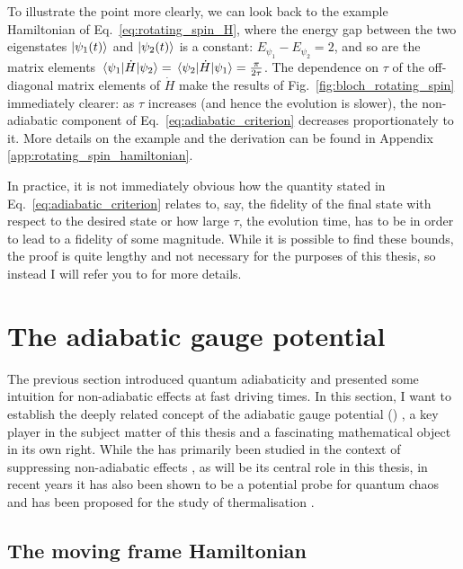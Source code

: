     To illustrate the point more clearly, we can look back to the example Hamiltonian of Eq.~\eqref{eq:rotating_spin_H}, where the energy gap between the two eigenstates $\ket{\psi_1(t)}$ and $\ket{\psi_2(t)}$ is a constant: $E_{\psi_1} - E_{\psi_2} = 2$, and so are the matrix elements $\mel{\psi_1}{\dot{H}}{\psi_2} = \mel{\psi_2}{\dot{H}}{\psi_1} = \frac{\pi}{2 \tau}$. The dependence on $\tau$ of the off-diagonal matrix elements of $\dot{H}$ make the results of Fig.~\ref{fig:bloch_rotating_spin} immediately clearer: as $\tau$ increases (and hence the evolution is slower), the non-adiabatic component of Eq.~\eqref{eq:adiabatic_criterion} decreases proportionately to it. More details on the example and the derivation can be found in Appendix \ref{app:rotating_spin_hamiltonian}.

     In practice, it is not immediately obvious how the quantity stated in Eq.~\eqref{eq:adiabatic_criterion} relates to, say, the fidelity of the final state with respect to the desired state or how large $\tau$, the evolution time, has to be in order to lead to a fidelity of some magnitude. While it is possible to find these bounds, the proof is quite lengthy and not necessary for the purposes of this thesis, so instead I will refer you to \cite{reichardt_quantum_2004, childs_lecture_2008} for more details.
    
    \section{The adiabatic gauge potential}\label{sec:2.2_AGP}

    The previous section introduced quantum adiabaticity and presented some intuition for non-adiabatic effects at fast driving times. In this section, I want to establish the deeply related concept of the adiabatic gauge potential () \cite{kolodrubetz_geometry_2017}, a key player in the subject matter of this thesis and a fascinating mathematical object in its own right. While the  has primarily been studied in the context of suppressing non-adiabatic effects \cite{sels_minimizing_2017, claeys_floquet-engineering_2019}, as will be its central role in this thesis, in recent years it has also been shown to be a potential probe for quantum chaos \cite{pandey_adiabatic_2020} and has been proposed for the study of thermalisation \cite{nandy_delayed_2022}. 

    \subsection{The moving frame Hamiltonian}

